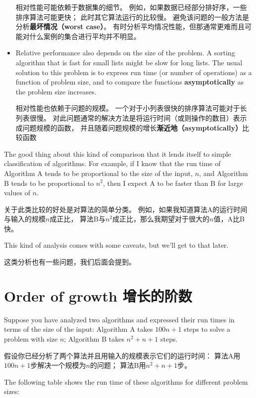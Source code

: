 \documentclass[10pt]{book}
\begin{document}
\begin{CJK}{UTF8}{gbsn}
\begin{itemize}
相对性能可能依赖于数据集的细节。
例如，如果数据已经部分排好序，一些排序算法可能更快；
此时其它算法运行的比较慢。
避免该问题的一般方法是分析{\bf 最坏情况（worst case）}。
有时分析平均情况性能，但那通常更难而且可能对什么案例的集合进行平均并不明显。

\item Relative performance also depends on the size of the
problem.  A sorting algorithm that is fast for small lists
might be slow for long lists.
The usual solution to this problem is to express run time
(or number of operations) as a function of problem size,
and to compare the functions {\bf asymptotically} as the problem
size increases.

相对性能也依赖于问题的规模。
一个对于小列表很快的排序算法可能对于长列表很慢。
对此问题通常的解决方法是将运行时间（或则操作的数目）表示成问题规模的函数，
并且随着问题规模的增长{\bf 渐近地（asymptotically）}比较函数

\end{itemize}

The good thing about this kind of comparison that it lends
itself to simple classification of algorithms.  For example,
if I know that the run time of Algorithm A tends to be
proportional to the size of the input, $n$, and Algorithm B
tends to be proportional to $n^2$, then I
expect A to be faster than B for large values of $n$.

关于此类比较的好处是对算法的简单分类。
例如，如果我知道算法A的运行时间与输入的规模$n$成正比，
算法B与$n^2$成正比，那么我期望对于很大的$n$值，A比B快。

This kind of analysis comes with some caveats, but we'll get
to that later.

这类分析也有一些问题，我们后面会提到。

\section{Order of growth 增长的阶数}

Suppose you have analyzed two algorithms and expressed
their run times in terms of the size of the input:
Algorithm A takes $100n+1$ steps to solve a problem with
size $n$; Algorithm B takes $n^2 + n + 1$ steps.

假设你已经分析了两个算法并且用输入的规模表示它们的运行时间：
算法A用$100n+1$步解决一个规模为$n$的问题；
算法B用$n^2 + n + 1$步。

The following table shows the run time of these algorithms
for different problem sizes:


\end{CJK}
\end{document}
